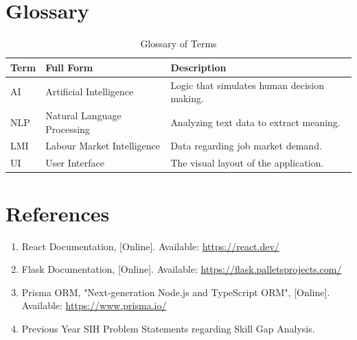 \documentclass[12pt,a4paper]{report}
\begin{document}
\chapter{Glossary}
\begin{table}[H]
\centering
\begin{tabular}{|p{3cm}|p{4cm}|p{7cm}|}
\hline
\textbf{Term} & \textbf{Full Form} & \textbf{Description} \\
\hline
AI & Artificial Intelligence & Logic that simulates human decision making. \\
\hline
NLP & Natural Language Processing & Analyzing text data to extract meaning. \\
\hline
LMI & Labour Market Intelligence & Data regarding job market demand. \\
\hline
UI & User Interface & The visual layout of the application. \\
\hline
\end{tabular}
\caption{Glossary of Terms}
\end{table}

\chapter{References}
\begin{enumerate}
    \item React Documentation, [Online]. Available: \url{https://react.dev/}
    \item Flask Documentation, [Online]. Available: \url{https://flask.palletsprojects.com/}
    \item Prisma ORM, "Next-generation Node.js and TypeScript ORM", [Online]. Available: \url{https://www.prisma.io/}
    \item Previous Year SIH Problem Statements regarding Skill Gap Analysis.
\end{enumerate}
\end{document}
